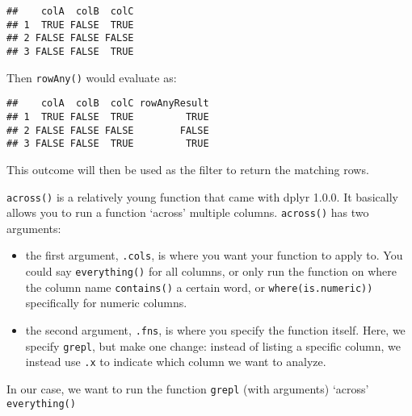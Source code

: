 \documentclass[
]{book}
\newenvironment{Shaded}{\begin{snugshade}}{\end{snugshade}}
\newcommand{\DataTypeTok}[1]{\textcolor[rgb]{0.13,0.29,0.53}{#1}}
\newcommand{\KeywordTok}[1]{\textcolor[rgb]{0.13,0.29,0.53}{\textbf{#1}}}
\newcommand{\NormalTok}[1]{#1}
\newcommand{\OperatorTok}[1]{\textcolor[rgb]{0.81,0.36,0.00}{\textbf{#1}}}
\newcommand{\OtherTok}[1]{\textcolor[rgb]{0.56,0.35,0.01}{#1}}
\newcommand{\StringTok}[1]{\textcolor[rgb]{0.31,0.60,0.02}{#1}}
\providecommand{\tightlist}{%
  \setlength{\itemsep}{0pt}\setlength{\parskip}{0pt}}
\begin{document}
\begin{verbatim}
##    colA  colB  colC
## 1  TRUE FALSE  TRUE
## 2 FALSE FALSE FALSE
## 3 FALSE FALSE  TRUE
\end{verbatim}

Then \texttt{rowAny()} would evaluate as:

\begin{Shaded}
\end{Shaded}

\begin{verbatim}
##    colA  colB  colC rowAnyResult
## 1  TRUE FALSE  TRUE         TRUE
## 2 FALSE FALSE FALSE        FALSE
## 3 FALSE FALSE  TRUE         TRUE
\end{verbatim}

This outcome will then be used as the filter to return the matching rows.

\texttt{across()} is a relatively young function that came with dplyr 1.0.0. It basically allows you to run a function `across' multiple columns. \texttt{across()} has two arguments:

\begin{itemize}
\tightlist
\item
  the first argument, \texttt{.cols}, is where you want your function to apply to. You could say \texttt{everything()} for all columns, or only run the function on where the column name \texttt{contains()} a certain word, or \texttt{where(is.numeric))} specifically for numeric columns.
\item
  the second argument, \texttt{.fns}, is where you specify the function itself. Here, we specify \texttt{grepl}, but make one change: instead of listing a specific column, we instead use \texttt{.x} to indicate which column we want to analyze.
\end{itemize}

In our case, we want to run the function \texttt{grepl} (with arguments) `across' \texttt{everything()}

\begin{Shaded}
\end{Shaded}
\end{document}
